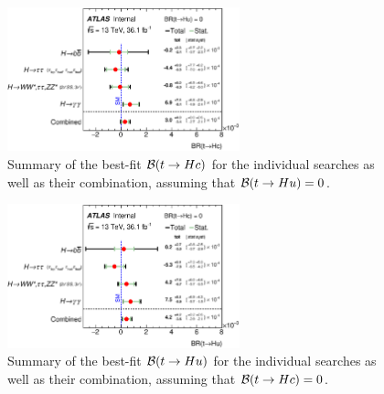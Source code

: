 \begin{figure}[t!]
\begin{center}
\includegraphics[width=0.6\textwidth]{figures/Combo/POI.eps}
\caption{\small {Summary of the best-fit $\mathcal{B}(t\to Hc)$ for the individual searches as well as their combination,
assuming that $\mathcal{B}(t\to Hu)=0$. }}
\label{fig:summary_printnum_hc} 
\end{center}
\end{figure}
\begin{figure}[h!]
\begin{center}
\includegraphics[width=0.6\textwidth]{figures/Combo/POI2.eps}
\caption{\small {Summary of the best-fit $\mathcal{B}(t\to Hu)$ for the individual searches as well as their combination,
assuming that $\mathcal{B}(t\to Hc)=0$. }}
\label{fig:summary_printnum_hu} 
\end{center}
\end{figure}

